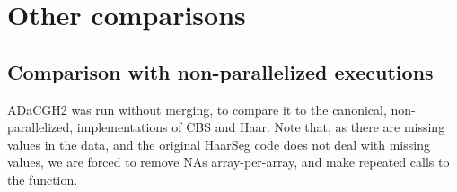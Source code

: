 \documentclass[a4paper,11pt]{article}
\begin{document}
\begin{landscape}
\begin{center}

\clearpage

\clearpage

\clearpage

\end{center}
\end{landscape}



\section{Other comparisons}

\subsection{Comparison with non-parallelized executions}

ADaCGH2 was run without merging, to compare it to the canonical,
non-parallelized, implementations of CBS and Haar. Note that, as there are
missing values in the data, and the original HaarSeg code does not deal
with missing values, we are forced to remove NAs array-per-array, and make
repeated calls to the function.
\end{document}
